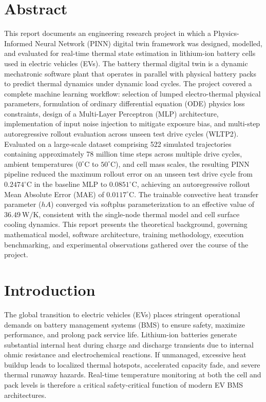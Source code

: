 \documentclass[12pt,a4paper]{article}
\begin{document}
\section*{Abstract}
This report documents an engineering research project in which a Physics-Informed Neural Network (PINN) digital twin framework was designed, modelled, and evaluated for real-time thermal state estimation in lithium-ion battery cells used in electric vehicles (EVs). The battery thermal digital twin is a dynamic mechatronic software plant that operates in parallel with physical battery packs to predict thermal dynamics under dynamic load cycles. The project covered a complete machine learning workflow: selection of lumped electro-thermal physical parameters, formulation of ordinary differential equation (ODE) physics loss constraints, design of a Multi-Layer Perceptron (MLP) architecture, implementation of input noise injection to mitigate exposure bias, and multi-step autoregressive rollout evaluation across unseen test drive cycles (WLTP2). Evaluated on a large-scale dataset comprising 522 simulated trajectories containing approximately 78 million time steps across multiple drive cycles, ambient temperatures ($0^\circ\text{C}$ to $50^\circ\text{C}$), and cell mass scales, the resulting PINN pipeline reduced the maximum rollout error on an unseen test drive cycle from $0.2474^\circ\text{C}$ in the baseline MLP to $0.0851^\circ\text{C}$, achieving an autoregressive rollout Mean Absolute Error (MAE) of $0.0117^\circ\text{C}$. The trainable convective heat transfer parameter ($hA$) converged via softplus parameterization to an effective value of $36.49~\text{W/K}$, consistent with the single-node thermal model and cell surface cooling dynamics. This report presents the theoretical background, governing mathematical model, software architecture, training methodology, execution benchmarking, and experimental observations gathered over the course of the project.

\newpage

\tableofcontents
\newpage

\listoffigures
\listoftables
\newpage

\setcounter{page}{1}

\section{Introduction}
The global transition to electric vehicles (EVs) places stringent operational demands on battery management systems (BMS) to ensure safety, maximize performance, and prolong pack service life. Lithium-ion batteries generate substantial internal heat during charge and discharge transients due to internal ohmic resistance and electrochemical reactions. If unmanaged, excessive heat buildup leads to localized thermal hotspots, accelerated capacity fade, and severe thermal runaway hazards. Real-time temperature monitoring at both the cell and pack levels is therefore a critical safety-critical function of modern EV BMS architectures.
\end{document}

